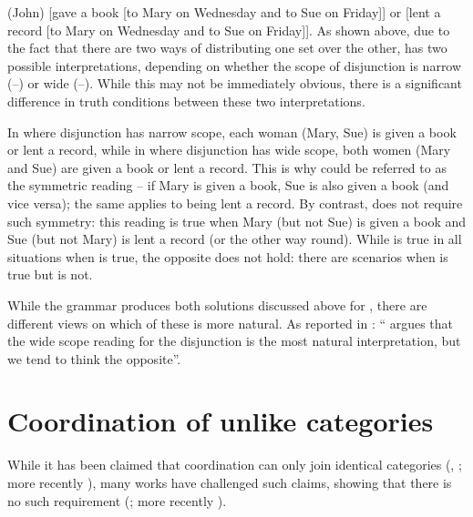 \documentclass[output=paper]{../langscibook}
\begin{document}
\ea\label{ex:max:man:96:43:S1:para} (John) [gave a book [to Mary on
    Wednesday and to Sue on Friday]] or [lent a record [to Mary on
    Wednesday and to Sue on Friday]].
\z
As shown above, due to the fact that there are two ways of distributing
one set over the other,  has two possible
interpretations, depending on whether the scope of disjunction is
narrow (–) or wide
(–).
%
While this may not be immediately obvious, there is a significant
difference in truth conditions between these two interpretations.

In  where disjunction has narrow scope, each woman (Mary, Sue) is
given a book or lent a record, while in  where disjunction has wide scope,
both women (Mary and Sue) are given a book or lent a record. This is
why  could be referred to as the symmetric
reading – if Mary is given a book, Sue is also given a book (and vice versa); the same
applies to being lent a record. By contrast, 
does not require such symmetry: this reading is true when Mary (but
not Sue) is given a book and Sue (but not Mary) is lent a record (or
the other way round). While  is true in all
situations when  is true, the opposite does not
hold: there are scenarios when  is true but
 is not.

While the grammar produces both solutions discussed above for
, there are different views on which of these
is more natural.
%
As reported in \citet[13]{max:man:96}: ``\citet{ble:94} argues
that the wide scope reading for the disjunction is the most natural
interpretation, but we tend to think the opposite''.


\section{Coordination of unlike categories}
\label{sec:Coordination:unlikes}

While it has been claimed that coordination can only join
identical categories (\citet[36]{chomsky1957syntactic}, \citet{will:81a}; more recently
\citet{bru:kha:20}), many works have challenged such claims, showing that there is no such
requirement (\citet{pete:81,sag:etal:85,baye:96}; more recently \citet{pat:prz:23:li}).
\end{document}
